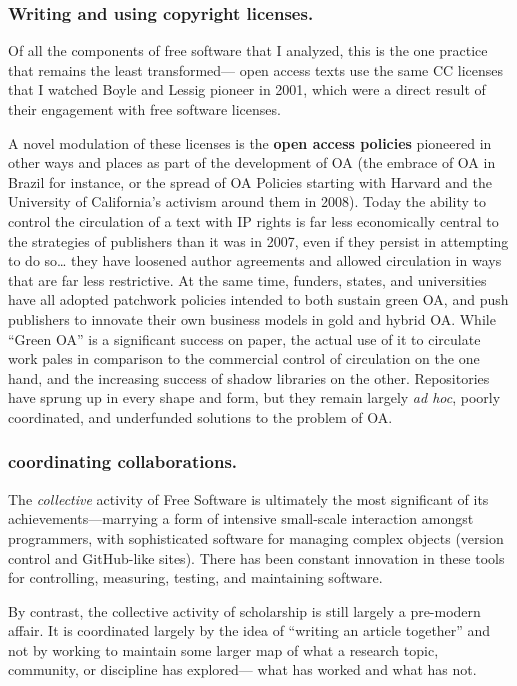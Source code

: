 \documentclass[11pt]{article}
\begin{document}
\subsubsection*{\textbf{Writing and using copyright licenses}.}
\label{sec:org6bed922}

Of all the components of free software that I analyzed, this is the one practice that remains the least transformed--- open access texts use the same CC licenses that I watched  Boyle and Lessig pioneer in 2001, which were a direct result of their engagement with free software licenses.

A novel modulation of these licenses is the \textbf{open access policies} pioneered in other ways and places as part of the development of OA (the embrace of OA in Brazil for instance, or the spread of OA Policies starting with Harvard and the University of California's activism around them in 2008).  Today the ability to control the circulation of a text with IP rights is far less economically central to the strategies of publishers than it was in 2007, even if they persist in attempting to do so\ldots{} they have loosened author agreements and allowed circulation in ways that are far less restrictive.  At the same time, funders, states, and universities have all adopted patchwork policies intended to both sustain green OA, and push publishers to innovate their own business models in gold and hybrid OA.  While ``Green OA'' is a significant success on paper, the actual use of it to circulate work pales in comparison to the commercial control of circulation on the one hand, and the increasing success of shadow libraries on the other. Repositories have sprung up in every shape and form, but they remain largely \emph{ad hoc}, poorly coordinated, and underfunded solutions to the problem of OA.

\subsubsection*{\textbf{coordinating collaborations}.}
\label{sec:org6c85a56}

The \emph{collective} activity of Free Software is ultimately the most significant of its achievements---marrying a form of intensive small-scale interaction amongst programmers, with sophisticated software for managing complex objects (version control and GitHub-like sites).  There has been constant innovation in these tools for controlling, measuring, testing, and maintaining software.

By contrast, the collective activity of scholarship is still largely a pre-modern affair.  It is coordinated largely by the idea of ``writing an article together'' and not by working to maintain some larger map of what a research topic, community, or discipline has explored--- what has worked and what has not. 
\end{document}

